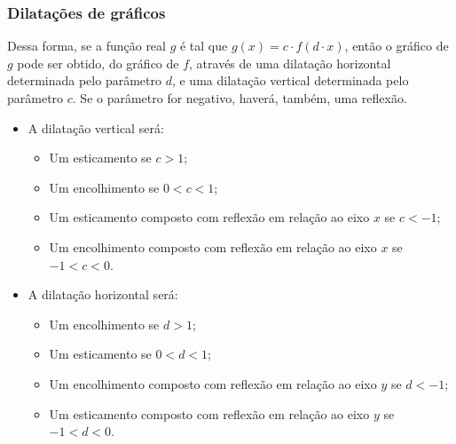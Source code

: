 
\begin{frame}
\frametitle{Dilatações de gráficos} 

Dessa forma, se a função real $g$ é tal que $g(x) = c \cdot f(d
\cdot x)$, então o gráfico de $g$ pode ser obtido, do gráfico de
$f$, através de uma dilatação horizontal determinada pelo parâmetro
$d$, e uma dilatação vertical determinada pelo parâmetro $c$. Se o
parâmetro for negativo, haverá, também, uma reflexão. \pause
\begin{itemize}
	\item A dilatação vertical será:
				\begin{itemize}
					\item Um esticamento se $c>1$;
					\item Um encolhimento se $0<c<1$;
					\item Um esticamento composto com reflexão em relação ao eixo $x$ se $c<-1$;
					\item Um encolhimento composto com reflexão em relação ao eixo $x$ se
					$-1<c<0$.
				\end{itemize} \pause
	\item A dilatação horizontal será:
				\begin{itemize}
					\item Um encolhimento se $d>1$;
					\item Um esticamento se $0<d<1$;
					\item Um encolhimento composto com reflexão em relação ao eixo $y$ se $d<-1$;
					\item Um esticamento composto com reflexão em relação ao eixo $y$ se
					$-1<d<0$.
				\end{itemize}
\end{itemize}


\end{frame}

